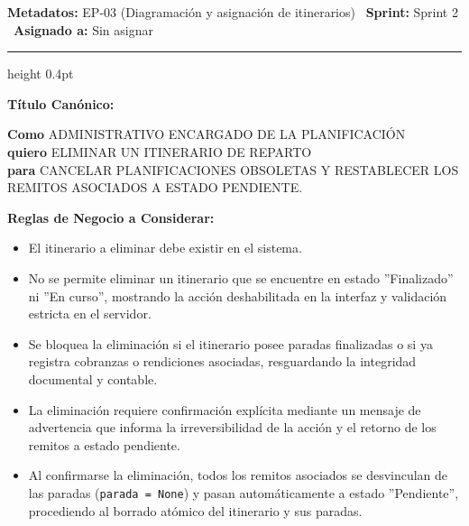 \documentclass[a4paper,9pt]{article}
\begin{document}
\begin{tcolorbox}[hucard, title={\textbf{HU-48: ELIMINAR ITINERARIO} \hfill \scriptsize \colorbox{tealstatus}{\textbf{\ Accepted\ }} \quad \colorbox{white}{\textcolor{primarydark}{\textbf{\ 2 pts\ }}}}]
\vspace{-1pt}
\noindent\textbf{\footnotesize Metadatos:} EP-03 (Diagramación y asignación de itinerarios) \textbar\ \textbf{Sprint:} Sprint 2 \textbar\ \textbf{Asignado a:} Sin asignar\par\vspace{2pt}
\hrule height 0.4pt\par\vspace{3pt}
\noindent\textbf{\footnotesize Título Canónico:}\par\vspace{1pt}
{\small \textbf{Como} ADMINISTRATIVO ENCARGADO DE LA PLANIFICACIÓN \\ \textbf{quiero} ELIMINAR UN ITINERARIO DE REPARTO \\ \textbf{para} CANCELAR PLANIFICACIONES OBSOLETAS Y RESTABLECER LOS REMITOS ASOCIADOS A ESTADO PENDIENTE.}\par\vspace{3pt}
\noindent\textbf{\footnotesize Reglas de Negocio a Considerar:}\par\vspace{1pt}
{\footnotesize
\begin{itemize}[leftmargin=12pt, nosep, itemsep=1.5pt, topsep=1pt]
\item El itinerario a eliminar debe existir en el sistema.
\item No se permite eliminar un itinerario que se encuentre en estado ''Finalizado'' ni ''En curso'', mostrando la acción deshabilitada en la interfaz y validación estricta en el servidor.
\item Se bloquea la eliminación si el itinerario posee paradas finalizadas o si ya registra cobranzas o rendiciones asociadas, resguardando la integridad documental y contable.
\item La eliminación requiere confirmación explícita mediante un mensaje de advertencia que informa la irreversibilidad de la acción y el retorno de los remitos a estado pendiente.
\item Al confirmarse la eliminación, todos los remitos asociados se desvinculan de las paradas (\texttt{parada = None}) y pasan automáticamente a estado ''Pendiente'', procediendo al borrado atómico del itinerario y sus paradas.
\end{itemize}
}
\end{tcolorbox}
\end{document}
